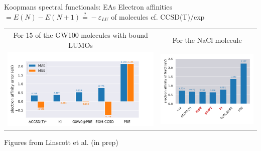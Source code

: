 \documentclass[xcolor=table,aspectratio=169]{beamer}
\numberwithin{equation}{section}
\begin{document}
\begin{frame}{Koopmans spectral functionals: EAs}
   Electron affinities $ = E(N) - E(N+1) \stackrel{?}{=} -\varepsilon_{LU}$ of molecules cf. CCSD(T)/exp
   \vspace{2ex}

   \small
   \begin{center}
      \begin{tabular}{c c}
         For 15 of the GW100 molecules with bound LUMOs                            &
         For the NaCl molecule                                                       \\
         \includegraphics[height=0.5\textheight]{figures/fig_gw100_ea_mae_mse.pdf} &
         \includegraphics[height=0.5\textheight]{figures/fig_NaCl_eas.pdf}           \\
      \end{tabular}
      \textcolor{seaborn_bg_grey_darker}{Figures from Linscott et al. (in prep)}
   \end{center}


\end{frame}
\end{document}
